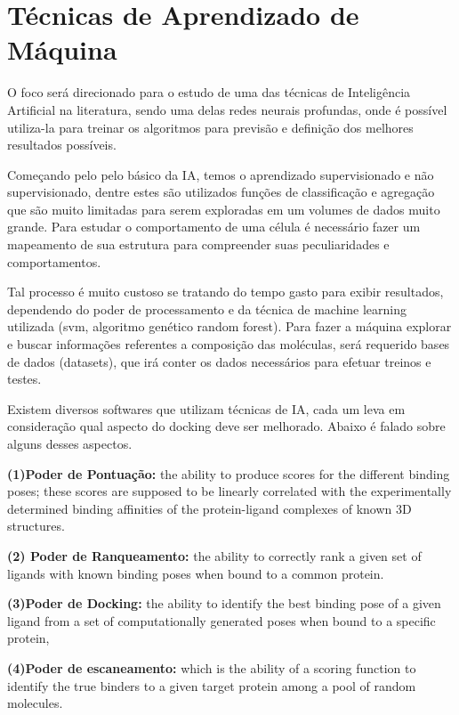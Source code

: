 \documentclass[tcc, capa]{texucpel}
\begin{document}
\section{Técnicas de Aprendizado de Máquina }
O foco será direcionado para o estudo de uma das técnicas de Inteligência Artificial na literatura, sendo uma delas redes neurais profundas, onde é possível utiliza-la para treinar os algoritmos para previsão e definição dos melhores resultados possíveis. 

Começando pelo pelo básico da IA, temos o aprendizado supervisionado e não supervisionado, dentre estes são utilizados funções de classificação e agregação que são muito limitadas para serem exploradas em um volumes de dados muito grande.
Para estudar o comportamento de uma célula é necessário fazer um mapeamento de sua estrutura para compreender suas peculiaridades e comportamentos. 

Tal processo é muito custoso se tratando do tempo gasto para exibir resultados, dependendo do poder de processamento e da técnica de machine learning utilizada (svm, algoritmo genético random forest). 
Para fazer a máquina explorar e buscar informações referentes a composição das moléculas, será requerido bases de dados (datasets), que irá conter os dados necessários para efetuar treinos e testes. 

Existem diversos softwares que utilizam técnicas de IA, cada um leva em consideração qual aspecto do docking deve ser melhorado. Abaixo é falado sobre alguns desses aspectos.

\textbf{(1)Poder de Pontuação:} the ability to produce scores for the different binding poses; these scores are supposed to be linearly correlated with the experimentally determined binding affinities of the protein-ligand complexes of known 3D structures. 

\textbf{(2) Poder de Ranqueamento:}
the ability to correctly rank a given set of ligands with known binding poses when bound to a common protein. 

\textbf{(3)Poder de Docking:} the ability to
identify the best binding pose of a given ligand from a set of computationally
generated poses when bound to a specific protein,

\textbf{(4)Poder de escaneamento:}
which is the ability of a scoring function to
identify the true binders to a given target protein among a pool of random
molecules.
\end{document}
